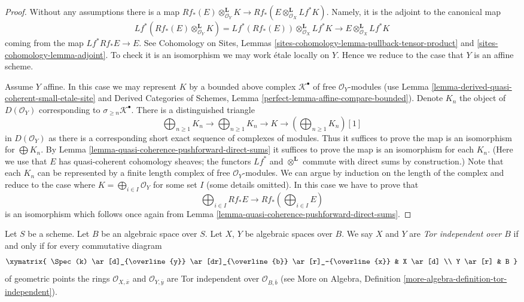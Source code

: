 \begin{proof}
Without any assumptions there is a map
$Rf_*(E) \otimes_{\mathcal{O}_Y}^\mathbf{L} K \to
Rf_*(E \otimes_{\mathcal{O}_X}^\mathbf{L} Lf^*K)$.
Namely, it is the adjoint to the canonical map
$$
Lf^*(Rf_*(E) \otimes_{\mathcal{O}_Y}^\mathbf{L} K) =
Lf^*(Rf_*(E)) \otimes_{\mathcal{O}_X}^\mathbf{L} Lf^*K
\longrightarrow
E \otimes_{\mathcal{O}_X}^\mathbf{L} Lf^*K
$$
coming from the map $Lf^*Rf_*E \to E$. See
Cohomology on Sites, Lemmas
\ref{sites-cohomology-lemma-pullback-tensor-product} and
\ref{sites-cohomology-lemma-adjoint}.
To check it is an isomorphism we may work \'etale locally on $Y$.
Hence we reduce to the case that $Y$ is an affine scheme.

\medskip\noindent
Assume $Y$ affine. In this case we may represent $K$ by a bounded
above complex $\mathcal{K}^\bullet$ of free $\mathcal{O}_Y$-modules
(use Lemma \ref{lemma-derived-quasi-coherent-small-etale-site}
and
Derived Categories of Schemes, Lemma
\ref{perfect-lemma-affine-compare-bounded}).
Denote $K_n$ the object of $D(\mathcal{O}_Y)$ corresponding to
$\sigma_{\geq n}\mathcal{K}^\bullet$. There is a distinguished triangle
$$
\bigoplus\nolimits_{n \geq 1} K_n \to
\bigoplus\nolimits_{n \geq 1} K_n \to
K \to
\left(\bigoplus\nolimits_{n \geq 1} K_n\right)[1]
$$
in $D(\mathcal{O}_Y)$ as there is a corresponding short exact sequence
of complexes of modules. Thus it suffices to prove the map
is an isomorphism for $\bigoplus K_n$. By
Lemma \ref{lemma-quasi-coherence-pushforward-direct-sums}
it suffices to prove the map is an isomorphism for each $K_n$.
(Here we use that $E$ has quasi-coherent cohomology sheaves;
the functors $Lf^*$ and $\otimes^\mathbf{L}$ commute
with direct sums by construction.)
Note that each $K_n$ can be represented by a finite length complex
of free $\mathcal{O}_Y$-modules. We can argue by induction
on the length of the complex and reduce to the case where
$K = \bigoplus_{i \in I} \mathcal{O}_Y$ for some set $I$
(some details omitted). In this case we have to prove that
$$
\bigoplus\nolimits_{i \in I} Rf_*E
\longrightarrow
Rf_*(\bigoplus\nolimits_{i \in I} E)
$$
is an isomorphism which follows once again from
Lemma \ref{lemma-quasi-coherence-pushforward-direct-sums}.
\end{proof}

\begin{definition}
\label{definition-tor-independent}
Let $S$ be a scheme. Let $B$ be an algebraic space over $S$.
Let $X$, $Y$ be algebraic spaces over $B$. We say $X$ and
$Y$ are {\it Tor independent over $B$} if and only if for every
commutative diagram
$$
\xymatrix{
\Spec(k) \ar[d]_{\overline{y}} \ar[dr]_{\overline{b}} \ar[r]_-{\overline{x}} &
X \ar[d] \\
Y \ar[r] & B
}
$$
of geometric points the rings
$\mathcal{O}_{X, \overline{x}}$ and $\mathcal{O}_{Y, \overline{y}}$
are Tor independent over $\mathcal{O}_{B, \overline{b}}$ (see
More on Algebra, Definition \ref{more-algebra-definition-tor-independent}).
\end{definition}

